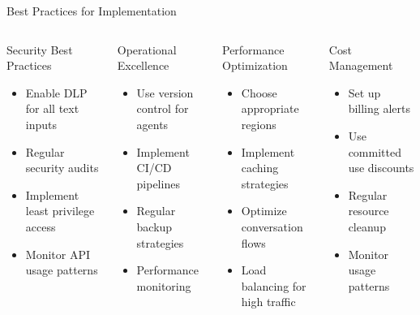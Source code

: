 \documentclass[aspectratio=169]{beamer}
\begin{document}
\begin{frame}{Best Practices for Implementation}
    \begin{columns}
        \begin{block}{\textcolor{googleblue}{\faShieldAlt} Security Best Practices}
            \begin{itemize}
                \item Enable DLP for all text inputs
                \item Regular security audits
                \item Implement least privilege access
                \item Monitor API usage patterns
            \end{itemize}
        \end{block}
        
        \begin{block}{\textcolor{googlegreen}{\faCogs} Operational Excellence}
            \begin{itemize}
                \item Use version control for agents
                \item Implement CI/CD pipelines
                \item Regular backup strategies
                \item Performance monitoring
            \end{itemize}
        \end{block}
        
        \begin{block}{\textcolor{googleyellow}{\faChartLine} Performance Optimization}
            \begin{itemize}
                \item Choose appropriate regions
                \item Implement caching strategies
                \item Optimize conversation flows
                \item Load balancing for high traffic
            \end{itemize}
        \end{block}
        
        \begin{block}{\textcolor{googlered}{\faDollarSign} Cost Management}
            \begin{itemize}
                \item Set up billing alerts
                \item Use committed use discounts
                \item Regular resource cleanup
                \item Monitor usage patterns
            \end{itemize}
        \end{block}
    \end{columns}
\end{frame}
\end{document}
